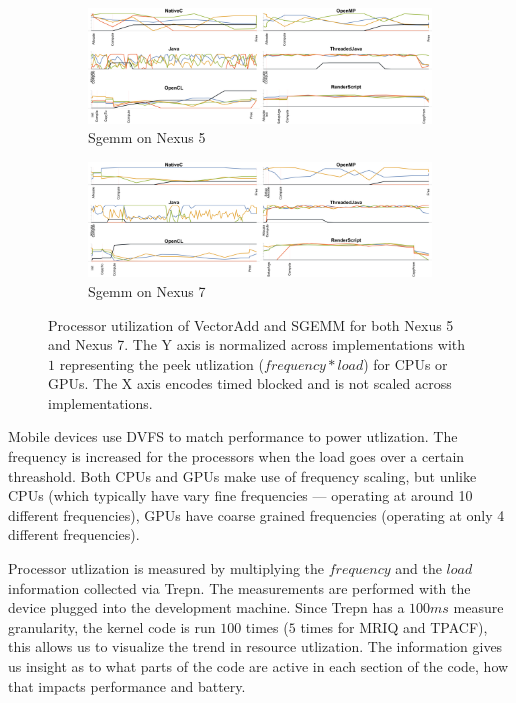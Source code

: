 \begin{figure}[ht]
  \begin{subfigure}[b]{0.9\textwidth}
       \centering
       \includegraphics[width=\textwidth]{data/load_sgemm_nexus5.pdf}
       \caption{Sgemm on Nexus 5}\label{fig:Sgemm5}
   \end{subfigure}
  \begin{subfigure}[b]{0.9\textwidth}
       \centering
       \includegraphics[width=\textwidth]{data/load_sgemm_nexus7.pdf}
       \caption{Sgemm on Nexus 7}\label{fig:Sgemm7}
   \end{subfigure}


  \caption{Processor utilization of VectorAdd and SGEMM for both Nexus 5 and Nexus 7. The Y axis is normalized across implementations with $1$ representing the peek utlization ($frequency*load$) for CPUs or GPUs. The X axis encodes timed blocked and is not scaled across implementations.}
  \label{fig:loadVecAddSgemm}
\end{figure}
\FloatBarrier

Mobile devices use DVFS to match performance to power utlization.
The frequency is increased for the processors when the load goes over a certain
  threashold.
Both CPUs and GPUs make use of frequency scaling, but unlike CPUs (which typically
  have vary fine frequencies --- operating at around 10 different frequencies), GPUs
  have coarse grained frequencies (operating at only 4 different frequencies).  

Processor utlization is measured by multiplying the $frequency$ and the $load$ information collected via Trepn.
The measurements are performed with the device plugged into the development machine.
Since Trepn has a $100ms$ measure granularity, the kernel code is run $100$ times
  ($5$ times for MRIQ and TPACF), this allows us to visualize the trend in resource
  utlization.
The information gives us insight as to what parts of the code are active in each
	section of the code, how that impacts performance and battery.


